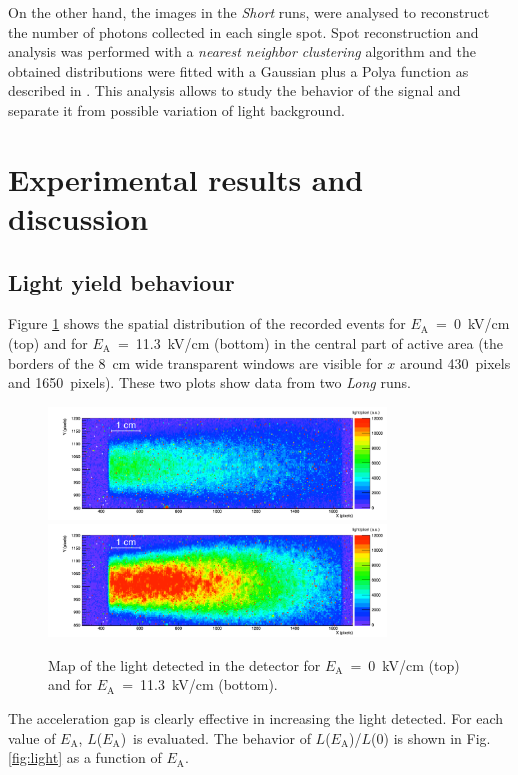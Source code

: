 \documentclass[a4paper,11pt]{article}
\newcommand{\Ea}  {$E_{\mathrm{A}}$}
\newcommand{\La}  {$L$(\Ea)}
\begin{document}
On the other hand, the images in the {\it Short} runs, were analysed to reconstruct the number of photons collected in each single spot. Spot reconstruction and analysis was performed with a {\it nearest neighbor clustering} algorithm and the obtained distributions were fitted with a Gaussian plus a Polya function as described in \cite{bib:fe55}. This analysis allows to study the behavior of the signal and separate it from possible variation of light background.

\section{Experimental results and discussion}

\subsection{Light yield behaviour}
\label{sec:ly}
Figure \ref{fig:beam} shows the spatial distribution of the recorded events for \Ea~=~0~kV/cm (top) and for \Ea~=~11.3~kV/cm (bottom) in the central part of active area (the borders of the
8~cm wide transparent windows are visible for $x$ around 430~pixels and 1650~pixels).
These two plots show data from two {\it Long} runs.

\begin{figure}[ht]
\centering
\includegraphics[width=0.8\textwidth]{hImage_3590.png}\\
\includegraphics[width=0.8\textwidth]{hImage_3583.png}
\caption{Map of the light detected in the detector for \Ea~=~0~kV/cm (top) and for \Ea~=~11.3~kV/cm (bottom).} 
\label{fig:beam}
\end{figure}

The acceleration gap is clearly effective in increasing the light detected.
For each value of \Ea, \La\ is evaluated.
The behavior of $L$(\Ea)/$L$(0) is shown in Fig.\ref{fig:light} as a function of \Ea.
\end{document}
